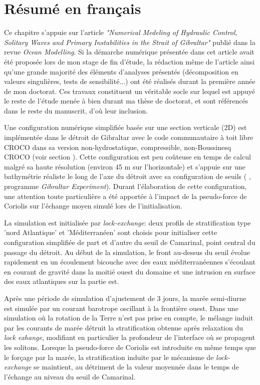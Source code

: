 \section{Résumé en français}

Ce chapitre s'appuie sur l'article \textit{"Numerical Medeling of Hydraulic Control, Solitary Waves and Primary Instabilities in the Strait of Gibraltar"} \citep{hilt_2020} publié dans la revue \textit{Ocean Modelling}. Si la démarche numérique présentée dans cet article avait été proposée lors de mon stage de fin d'étude, la rédaction même de l'article ainsi qu'une grande majorité des éléments d'analyses présentés (décomposition en valeurs singulières, tests de sensibilité...) ont été réalisés durant la première année de mon doctorat. Ces travaux constituent un véritable socle sur lequel est appuyé le reste de l'étude menée à bien durant ma thèse de doctorat, et sont référencés dans le reste du manuscrit, d'où leur inclusion.

Une configuration numérique simplifiée basée sur une section verticale (2D) est implémentée dans le détroit de Gibraltar avec le code communautaire à toit libre CROCO dans sa version non-hydrostatique, compressible, non-Boussinesq CROCO (voir section ). Cette configuration est peu coûteuse en temps de calcul malgré sa haute résolution (environ 45 m sur l'horizontale) et s'appuie sur une bathymétrie réaliste le long de l'axe du détroit avec sa configuration de seuils ( \citet{armi_1988}, programme \textit{Gibraltar Experiment}). Durant l'élaboration de cette configuration, une attention toute particulière a été apportée à l'impact de la pseudo-force de Coriolis sur l'échange moyen simulé lors de l'initialisation.

La simulation est initialisée par \textit{lock-exchange}: deux profils de stratification type 'nord Atlantique' et 'Méditerranéen' sont choisis pour initialiser cette configuration simplifiée de part et d'autre du seuil de Camarinal, point central du passage du détroit. Au début de la simulation, le front au-dessus du seuil évolue rapidement en un écoulement bicouche avec des eaux méditerranéennes s'écoulant en courant de gravité dans la moitié ouest du domaine et une intrusion en surface des eaux atlantiques sur la partie est. 

Après une période de simulation d'ajustement de 3 jours, la marée semi-diurne est simulée par un courant barotrope oscillant à la frontière ouest. Dans une simulation où la rotation de la Terre n'est pas prise en compte, le mélange induit par les courants de marée détruit la stratification obtenue après relaxation du \textit{lock exhange}, modifiant en particulier la profondeur de l'interface où se propagent les solitons. Lorsque la pseudo-force de Coriolis est introduite en même temps que le forçage par la marée, la stratification induite par le mécanisme de \textit{lock-exchange} se maintient, au détriment de la valeur moyennée dans le temps de l'échange au niveau du seuil de Camarinal.

